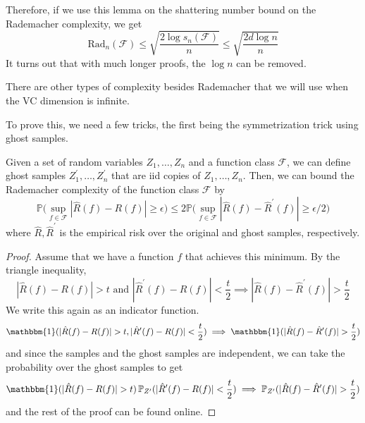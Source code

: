   Therefore, if we use this lemma on the shattering number bound on the Rademacher complexity, we get 
  \begin{equation}
    \mathrm{Rad}_n (\mathcal{F}) \leq \sqrt{\frac{2 \log s_n (\mathcal{F})}{n}} \leq \sqrt{\frac{2 d \log{n}}{n}} 
  \end{equation}
  It turns out that with much longer proofs, the $\log{n}$ can be removed. 

  There are other types of complexity besides Rademacher that we will use when the VC dimension is infinite. 

  To prove this, we need a few tricks, the first being the symmetrization trick using ghost samples. 

  \begin{lemma}
    Given a set of random variables $Z_1, \ldots, Z_n$ and a function class $\mathcal{F}$, we can define ghost samples $Z_1^\prime, \ldots, Z_n^\prime$ that are iid copies of $Z_1, \ldots, Z_n$. Then, we can bound the Rademacher complexity of the function class $\mathcal{F}$ by 
    \begin{equation}
      \mathbb{P} \bigg( \sup_{f \in \mathcal{F}} | \hat{R} (f) - R(f) | \geq \epsilon \bigg) \leq 2 \mathbb{P} \bigg( \sup_{f \in \mathcal{F}} | \hat{R} (f) - \hat{R}^\prime (f) | \geq \epsilon / 2 \bigg)
    \end{equation}
    where $\hat{R}, \hat{R}^\prime$ is the empirical risk over the original and ghost samples, respectively. 
  \end{lemma}
  \begin{proof}
    Assume that we have a function $f$ that achieves this minimum. By the triangle inequality, 
    \begin{equation}
      | \hat{R} (f) - R(f)| > t \text{ and } | \hat{R}^\prime (f) - R(f)| < \frac{t}{2} \implies | \hat{R} (f) - \hat{R}^\prime (f) | > \frac{t}{2}
    \end{equation}
    We write this again as an indicator function. 
    \begin{equation}
      \mathbbm{1} (| \hat{R} (f) - R(f)| > t, | \hat{R}^\prime (f) - R(f)| < \frac{t}{2}) \implies \mathbbm{1} (| \hat{R} (f) - \hat{R}^\prime (f) | > \frac{t}{2})
    \end{equation}
    and since the samples and the ghost samples are independent, we can take the probability over the ghost samples to get 
    \begin{equation}
      \mathbbm{1} (| \hat{R} (f) - R(f)| > t) \, \mathbb{P}_{Z^\prime} (| \hat{R}^\prime (f) - R(f)| < \frac{t}{2}) \implies \mathbb{P}_{Z^\prime} (| \hat{R} (f) - \hat{R}^\prime (f) | > \frac{t}{2})
    \end{equation}
    and the rest of the proof can be found online. 
  \end{proof}

